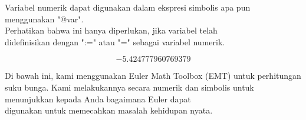 \documentclass[a4paper,10pt]{article}
\begin{document}
\begin{eulernotebook}
\begin{eulercomment}
\begin{eulercomment}
\begin{eulercomment}
\begin{eulercomment}
\begin{eulercomment}
\begin{eulercomment}
\begin{euleroutput}
\end{euleroutput}
\begin{eulercomment}
Variabel numerik dapat digunakan dalam ekspresi simbolis apa pun
menggunakan "@var". \\
Perhatikan bahwa ini hanya diperlukan, jika variabel telah\\
didefinisikan dengan ":=" atau "=" sebagai variabel numerik.
\end{eulercomment}
\begin{eulerformula}
\[
-5.424777960769379
\]
\end{eulerformula}
\begin{eulercomment}
Di bawah ini, kami menggunakan Euler Math Toolbox (EMT) untuk
perhitungan suku bunga. Kami melakukannya secara numerik dan simbolis
untuk menunjukkan kepada Anda bagaimana Euler dapat\\
digunakan untuk memecahkan masalah kehidupan nyata.


\end{eulercomment}
\end{eulercomment}
\end{eulercomment}
\end{eulercomment}
\end{eulercomment}
\end{eulercomment}
\end{eulercomment}
\end{eulernotebook}
\end{document}
